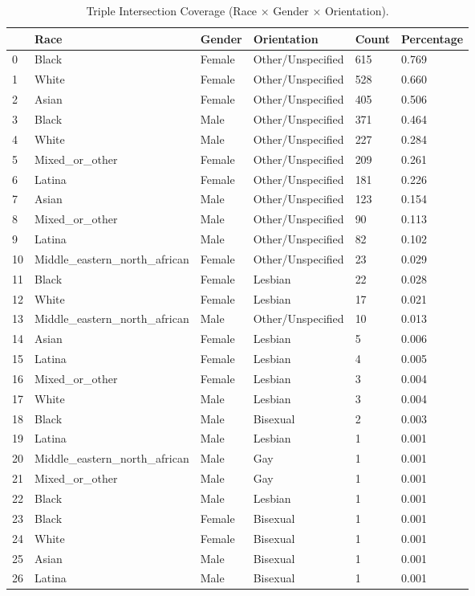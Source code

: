 \begin{table}[htbp]
\centering
\caption{Triple Intersection Coverage (Race × Gender × Orientation).}
\label{tab:eda_intersections_rgo}
\begin{tabular}{llllll}
\toprule
 & Race & Gender & Orientation & Count & Percentage \\
\midrule
0 & Black & Female & Other/Unspecified & 615 & 0.769 \\
1 & White & Female & Other/Unspecified & 528 & 0.660 \\
2 & Asian & Female & Other/Unspecified & 405 & 0.506 \\
3 & Black & Male & Other/Unspecified & 371 & 0.464 \\
4 & White & Male & Other/Unspecified & 227 & 0.284 \\
5 & Mixed\_or\_other & Female & Other/Unspecified & 209 & 0.261 \\
6 & Latina & Female & Other/Unspecified & 181 & 0.226 \\
7 & Asian & Male & Other/Unspecified & 123 & 0.154 \\
8 & Mixed\_or\_other & Male & Other/Unspecified & 90 & 0.113 \\
9 & Latina & Male & Other/Unspecified & 82 & 0.102 \\
10 & Middle\_eastern\_north\_african & Female & Other/Unspecified & 23 & 0.029 \\
11 & Black & Female & Lesbian & 22 & 0.028 \\
12 & White & Female & Lesbian & 17 & 0.021 \\
13 & Middle\_eastern\_north\_african & Male & Other/Unspecified & 10 & 0.013 \\
14 & Asian & Female & Lesbian & 5 & 0.006 \\
15 & Latina & Female & Lesbian & 4 & 0.005 \\
16 & Mixed\_or\_other & Female & Lesbian & 3 & 0.004 \\
17 & White & Male & Lesbian & 3 & 0.004 \\
18 & Black & Male & Bisexual & 2 & 0.003 \\
19 & Latina & Male & Lesbian & 1 & 0.001 \\
20 & Middle\_eastern\_north\_african & Male & Gay & 1 & 0.001 \\
21 & Mixed\_or\_other & Male & Gay & 1 & 0.001 \\
22 & Black & Male & Lesbian & 1 & 0.001 \\
23 & Black & Female & Bisexual & 1 & 0.001 \\
24 & White & Female & Bisexual & 1 & 0.001 \\
25 & Asian & Male & Bisexual & 1 & 0.001 \\
26 & Latina & Male & Bisexual & 1 & 0.001 \\
\bottomrule
\end{tabular}

\end{table}